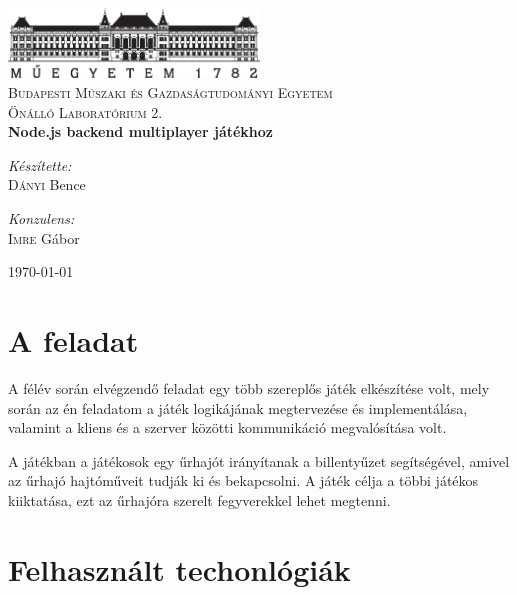 \documentclass[11pt]{article}
\begin{document}
\begin{titlepage}
  \begin{center}
    \includegraphics[width=0.5\textwidth]{figures/logo}~\\[1cm]
    \textsc{Budapesti Műszaki és Gazdaságtudományi Egyetem}
    \\[1.5cm]
    \textsc{\Large Önálló Laboratórium 2.}
    \\[1cm]
    { \huge \bfseries Node.js backend multiplayer játékhoz }
    \\[2cm]

    \noindent
    \begin{minipage}[t]{0.4\textwidth}
      \begin{flushleft}
        \large
        \emph{Készítette:}\\
        \textsc{Dányi} Bence
    \end{flushleft}
    \end{minipage}%
    \begin{minipage}[t]{0.4\textwidth}
      \begin{flushright}
        \large
        \emph{Konzulens:} \\
        \textsc{Imre} Gábor
      \end{flushright}
    \end{minipage}

    \vfill

    {\large \today}
  \end{center}
\end{titlepage}
\section{A feladat}

A félév során elvégzendő feladat egy több szereplős játék elkészítése volt,
mely során az én feladatom a játék logikájának megtervezése és implementálása,
valamint a kliens és a szerver közötti kommunikáció megvalósítása volt.

A játékban a játékosok egy űrhajót irányítanak a billentyűzet segítségével,
amivel az űrhajó hajtóműveit tudják ki és bekapcsolni.
A játék célja a többi játékos kiiktatása, ezt az űrhajóra szerelt fegyverekkel
lehet megtenni.

\section{Felhasznált techonlógiák}
\end{document}
